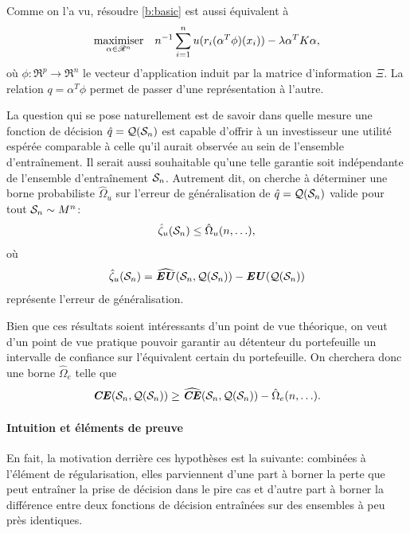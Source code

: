 Comme on l'a vu, résoudre \eqref{b:basic} est aussi équivalent à
\begin{equation}
  \maximizeEquation[\alpha \in \Re^n]{n^{-1} \sumi u(r_i(\alpha^T\phi)(x_i)) - \lambda \alpha^TK\alpha,}
\end{equation}
où $\phi:\Re^p \to \Re^n$ le vecteur d'application induit par la matrice d'information $\Xi$. La
relation $q = \alpha^T\phi$ permet de passer d'une représentation à l'autre.

La question qui se pose naturellement est de savoir dans quelle mesure une fonction de
décision $\hat q = \alg(\S_n)$ est capable d'offrir à un investisseur une utilité espérée
comparable à celle qu'il aurait observée au sein de l'ensemble d'entraînement. Il serait
aussi souhaitable qu'une telle garantie soit indépendante de l'ensemble d'entraînement
$\S_n$. Autrement dit, on cherche à déterminer une borne probabiliste $\hat\Omega_u$ sur l'erreur de
généralisation de $\hat q = \alg(\S_n)$ valide pour tout $\S_n \sim M^n$:
\begin{equation}
 \hat\zeta_u(\S_n) \leq \hat\Omega_u(n,\ldots),
\end{equation}
où
\begin{equation}
  \label{b:zeta}
  \hat\zeta_u(\S_n) =  \hEU(\S_n,\alg(\S_n)) - \EU(\alg(\S_n))
\end{equation}
représente l'erreur de généralisation.

Bien que ces résultats soient intéressants d'un point de vue théorique, on veut d'un point
de vue pratique pouvoir garantir au détenteur du portefeuille un intervalle de confiance
sur l'équivalent certain du portefeuille. On cherchera donc une borne $\hat\Omega_e$ telle que
\begin{equation}
  \CE(\S_n,\alg(\S_n)) \geq \hCE(\S_n,\alg(\S_n)) - \hat\Omega_e(n,\ldots).
\end{equation}



\paragraph{Intuition et éléments de preuve}

En fait, la motivation derrière ces hypothèses est la suivante: combinées à l'élément de
régularisation, elles parviennent d'une part à borner la perte que peut entraîner la prise
de décision dans le pire cas et d'autre part à borner la différence entre deux fonctions
de décision entraînées sur des ensembles à peu près identiques.

